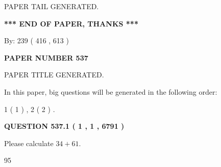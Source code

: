 \documentclass[12pt]{article}
\begin{document}
   
   
   
   
   
 \vspace{0.2in}
 
   
   
\vspace{2.0in} PAPER TAIL GENERATED.
   
   
   
   
\vspace{1.0in} 
{\textbf{\large{ *** END OF PAPER, THANKS *** }}} 
   
   
\hspace{1.0in} By: 
 239 ( 416 ,  613 )
   
   
   
   
\newpage 
\setcounter{page}{ 
   537001 } 
   
   
   
   
 {\textbf{ \Large{ PAPER NUMBER  537  }}}
   
   
\vspace{0.2in}
   
   
   
   
   
   
   
   
 \vspace{0.2in}
 
 
 
 
   
   
 PAPER TITLE GENERATED.
   
   
   
\vspace{0.2in}
   
In this paper, big questions will be generated in the following order: 
   
   
   1 ( 1 )
 ,
   2 ( 2 )
 .
  
\vspace{0.2in}
  
{\textbf{\Large{QUESTION
537.1 
 ( 1 , 1 , 6791 )
}}}
  
  
 
Please calculate $ %
34 +  %
61 $.
 
 
 
\noindent{}
 
 

95
 
 
\noindent{}
 
\end{document}

